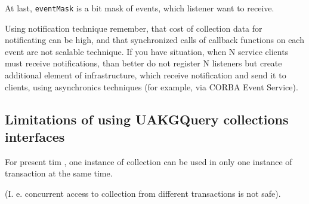  At last, \verb|eventMask| is a bit mask of events, which listener want to receive.


 Using notification technique remember, that cost of collection data for 
notificating can be high, and that synchronized calls of callback functions
on each event are not scalable technique. If you have situation, when N service
clients must receive notifications, than better do not register N listeners but 
create additional element of infrastructure, which receive notification and 
send it to clients, using asynchronics techniques (for example, via CORBA Event Service).


\subsection{ Limitations of using UAKGQuery collections interfaces }

For present tim , one instance of collection can be used in only 
one instance of transaction at the same time.

(I. e. concurrent access to collection from different transactions is 
not safe).



